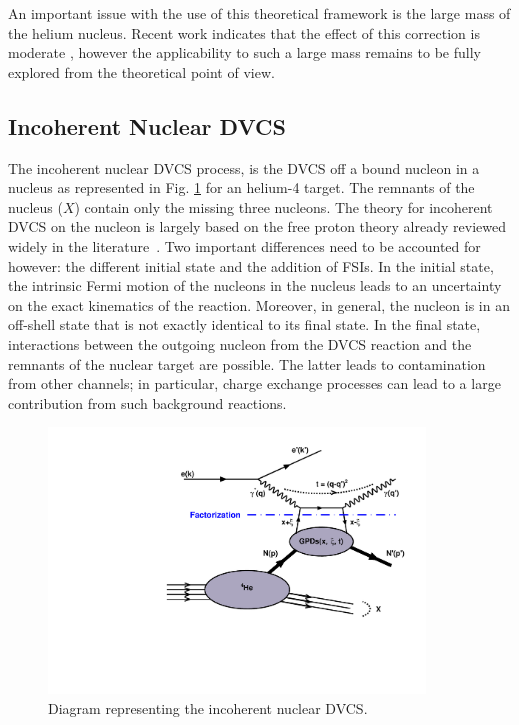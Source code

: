 \documentclass[aps,prc,preprint,superscriptaddress]{revtex4}
\begin{document}
An important issue with the use of this theoretical framework is the large mass of the 
helium nucleus. Recent work indicates that the effect of this correction is moderate 
\cite{Braun:2012bg}, however the applicability to such a large mass remains to be
fully explored from the theoretical point of view.

\subsection{Incoherent Nuclear DVCS}

The incoherent nuclear DVCS process, is the DVCS off a bound nucleon in a nucleus
as represented in Fig. \ref{fig:InCohDiag} for an helium-4 target. The remnants of 
the nucleus ($X$) contain only the missing three nucleons. 
The theory for incoherent DVCS on the nucleon is largely based on the free proton theory
already reviewed widely in the literature~\cite{Diehl:2003ny,Belitsky:2005qn,Guidal:2013rya}. 
Two important differences need to be accounted for however: the different initial state and the addition of 
FSIs. In the initial state, the intrinsic Fermi motion of the nucleons in the nucleus 
leads to an uncertainty on the exact kinematics of the reaction. Moreover, in general, the nucleon 
is in an off-shell state that is not exactly identical to its final state. In the final state, 
interactions between the outgoing nucleon from the DVCS reaction and the remnants of the nuclear 
target are possible. The latter leads to contamination from other channels; in particular, 
charge exchange processes can lead to a large contribution from such background reactions. 

\begin{figure}[tbp!]
\center
\includegraphics[width=10cm]{handbag_incoherent.pdf}
\caption{Diagram representing the incoherent nuclear DVCS.}
\label{fig:InCohDiag}
\end{figure}
\end{document}
